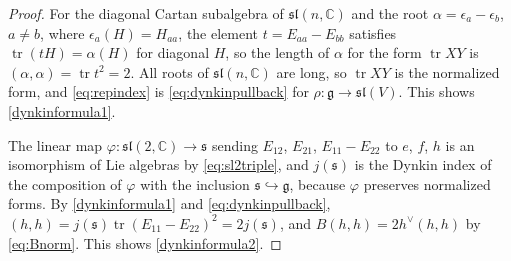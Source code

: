 \documentclass[leqno,10pt]{amsart}
\theoremstyle{definition}
\numberwithin{equation}{section}
\newcommand{\ep}{\epsilon}
\newcommand{\al}{\alpha}
\newcommand{\sll}{\mathfrak{sl}}
\newcommand{\g}{\mathfrak{g}}
\newcommand{\com}{\mathbb C}
\newcommand{\tr}{\operatorname{tr}}
\newcommand{\hv}{h^\vee}
\newcommand{\subs}{\mathfrak{s}}
\begin{document}
\begin{proof}
For the diagonal Cartan subalgebra of $\sll(n, \com)$ and the root $\al = \ep_{a} - \ep_{b}$, $a \neq b$, where $\ep_{a}(H) = H_{aa}$, the element $t = E_{aa} - E_{bb}$ satisfies $\tr(tH) = \al(H)$ for diagonal $H$, so the length of $\al$ for the form $\tr XY$ is $(\al, \al) = \tr t^{2} = 2$. All roots of $\sll(n, \com)$ are long, so $\tr XY$ is the normalized form, and \eqref{eq:repindex} is \eqref{eq:dynkinpullback} for $\rho:\g \to \sll(V)$. This shows \ref{dynkinformula1}.

The linear map $\varphi:\sll(2, \com) \to \subs$ sending $E_{12}$, $E_{21}$, $E_{11} - E_{22}$ to $e$, $f$, $h$ is an isomorphism of Lie algebras by \eqref{eq:sl2triple}, and $j(\subs)$ is the Dynkin index of the composition of $\varphi$ with the inclusion $\subs \hookrightarrow \g$, because $\varphi$ preserves normalized forms. By \ref{dynkinformula1} and \eqref{eq:dynkinpullback}, $(h, h) = j(\subs)\tr(E_{11} - E_{22})^{2} = 2j(\subs)$, and $B(h, h) = 2\hv(h, h)$ by \eqref{eq:Bnorm}. This shows \ref{dynkinformula2}.
\end{proof}
\end{document}
